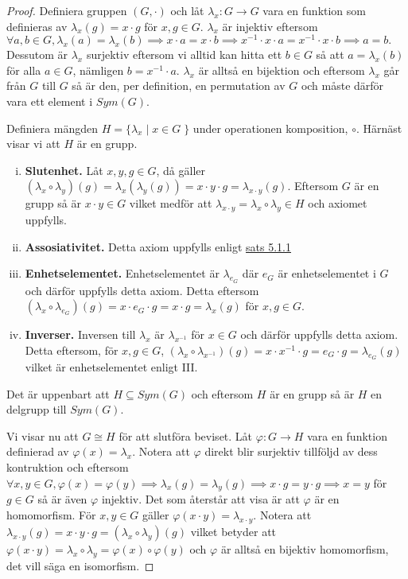 \documentclass{article}
\theoremstyle{definition}
\begin{document}
\begin{proof}
  Definiera gruppen $(G, \cdot)$ och låt $\lambda_x: G \rightarrow G$ vara en funktion som 
  definieras av $\lambda_x (g) = x \cdot g$ för $x, g \in G$. 
  $\lambda_x$ är injektiv eftersom $\forall a, b \in G, \lambda_x(a) = \lambda_x (b) \implies
  x \cdot a = x \cdot b \implies x^{-1} \cdot x \cdot a = x^{-1} \cdot x \cdot b \implies a = b.$
  Dessutom är $\lambda_x$ surjektiv eftersom vi alltid kan hitta ett $b \in G$ så att 
  $a = \lambda_x(b)$ för alla $a \in G$, nämligen $b = x^{-1} \cdot a.$
  $\lambda_x$ är alltså en bijektion och eftersom $\lambda_x$ går från $G$ till $G$ så är 
  den, per definition, en permutation av $G$ och måste därför vara ett element i $Sym(G)$. 

  Definiera mängden $H = \{\lambda_x \; |\; x \in G\; \}$ under operationen komposition, $\circ$.
  Härnäst visar vi att $H$ är en grupp.
  \begin{enumerate}[(i)]
    \item \textbf{Slutenhet.} Låt $x, y, g \in G$, då gäller
    $(\lambda_x \circ \lambda_y)(g) = \lambda_x(\lambda_y(g)) = x \cdot y \cdot g = 
    \lambda_{x \cdot y}(g).$ Eftersom $G$ är en grupp så är $x \cdot y \in G$ vilket medför 
    att $\lambda_{x \cdot y} = \lambda_x \circ \lambda_y \in H$ och axiomet uppfylls.
    \item \textbf{Assosiativitet.} Detta axiom uppfylls enligt \hyperlink{ass}{sats 5.1.1}
    \item \textbf{Enhetselementet.} Enhetselementet är $\lambda_{e_G}$ där $e_G$ är 
    enhetselementet i $G$ och därför 
    uppfylls detta axiom. Detta eftersom $(\lambda_x \circ \lambda_{e_G})(g) = x \cdot e_G \cdot g
    = x \cdot g = \lambda_x (g)$ för $x, g \in G.$
    \item \textbf{Inverser.} Inversen till $\lambda_x$ är $\lambda_{x^{-1}}$ för $x \in G$
    och därför uppfylls detta axiom. 
    Detta eftersom, för $x, g \in G$, $(\lambda_x \circ \lambda_{x^{-1}})(g) = x \cdot x^{-1} \cdot g = 
    e_G \cdot g = \lambda_{e_G} (g)$ vilket är enhetselementet enligt III.
  \end{enumerate}
  Det är uppenbart att $H \subseteq Sym(G)$ och eftersom $H$ är en grupp så är $H$ en delgrupp 
  till $Sym(G)$. 

  Vi visar nu att $G \cong H$ för att slutföra beviset. Låt $\varphi: G \rightarrow H$ 
  vara en funktion definierad av $\varphi(x) = \lambda_x$. Notera att $\varphi$ direkt 
  blir surjektiv tillföljd av dess kontruktion och eftersom 
  $\forall x, y \in G, \varphi(x) = \varphi(y) \implies \lambda_x (g) = \lambda_y (g)
  \implies x \cdot g = y \cdot g \implies x = y$ för $g \in G$ så är även $\varphi$ injektiv. 
  Det som återstår att visa är att $\varphi$ är en homomorfism. För 
  $x, y \in G$ gäller $\varphi(x \cdot y) = \lambda_{x \cdot y}$. 
  Notera att $\lambda_{x \cdot y} (g) = x \cdot y \cdot g = (\lambda_x \circ \lambda_y)(g)$ 
  vilket betyder att $\varphi(x \cdot y) = \lambda_x \circ \lambda_y = \varphi(x) \circ \varphi(y)$
  och $\varphi$ är alltså en bijektiv homomorfism, det vill säga en isomorfism.
\end{proof}
\end{document}

